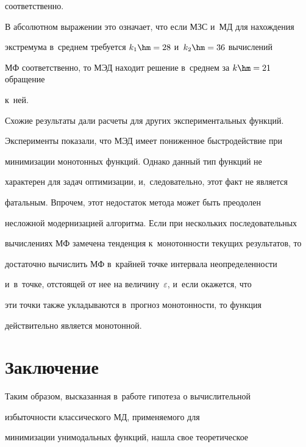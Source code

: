 соответственно.


  


  В абсолютном выражении это означает, что если МЗС и~МД для на\-хож\-де\-ния 


экстремума в~среднем требуется $k_1 \hm= 28$ и~$k_2\hm = 36$ вы\-чис\-ле\-ний 


МФ соответственно, то МЭД находит решение в~среднем за $k \hm= 21$ обра\-ще\-ние


к~ней.


  


  Схожие результаты дали расчеты для других экспериментальных функций. 


  


  Эксперименты показали, что МЭД имеет пониженное быстродействие при 


минимизации монотонных функций. Однако данный тип функций не 


характерен для задач оптимизации, и,~следовательно, этот факт не является 


фатальным. Впрочем, этот недостаток метода может быть преодолен 


несложной модернизацией алгоритма. Если при нескольких последовательных 


вычислениях МФ замечена тенденция к~монотонности текущих результатов, то 


достаточно вы\-чис\-лить МФ в~крайней точке интервала неопределенности 


и~в~точке, отстоящей от нее на величину~$\varepsilon$, и~если окажется, что 


эти точки также укладываются в~прогноз монотонности, то функция 


действительно является монотонной. 








\section{Заключение }





  Таким образом, высказанная в~работе гипотеза о вычислительной 


избы\-точ\-ности классического МД, применяемого для 


минимизации унимодальных функций, нашла свое теоретическое 


